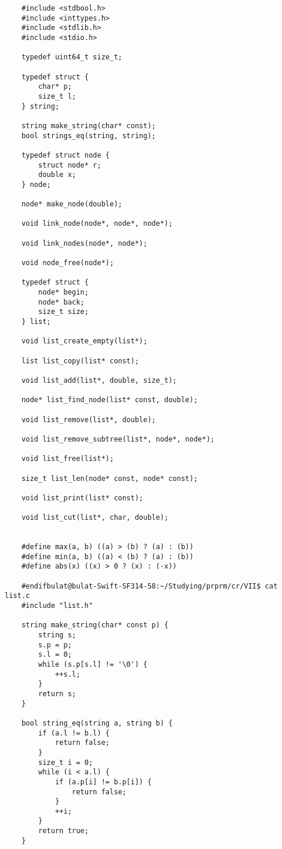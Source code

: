 \documentclass[a4paper]{article}
\newcounter{i}
\begin{document}
\begin{enumerate}[label=\textbf{\arabic*}.]
\begin{verbatim}
    #include <stdbool.h>
    #include <inttypes.h>
    #include <stdlib.h>
    #include <stdio.h>
    
    typedef uint64_t size_t;
    
    typedef struct {
        char* p;
        size_t l;
    } string;
    
    string make_string(char* const);
    bool strings_eq(string, string);
    
    typedef struct node {
        struct node* r;
        double x;
    } node;
    
    node* make_node(double);
    
    void link_node(node*, node*, node*);
    
    void link_nodes(node*, node*);
    
    void node_free(node*);
    
    typedef struct {
        node* begin;
        node* back;
        size_t size;
    } list;
    
    void list_create_empty(list*);
    
    list list_copy(list* const);
    
    void list_add(list*, double, size_t);
    
    node* list_find_node(list* const, double);
    
    void list_remove(list*, double);
    
    void list_remove_subtree(list*, node*, node*);
    
    void list_free(list*);
    
    size_t list_len(node* const, node* const);
    
    void list_print(list* const);
    
    void list_cut(list*, char, double);
    
    
    #define max(a, b) ((a) > (b) ? (a) : (b))
    #define min(a, b) ((a) < (b) ? (a) : (b))
    #define abs(x) ((x) > 0 ? (x) : (-x))
    
    #endifbulat@bulat-Swift-SF314-58:~/Studying/prprm/cr/VII$ cat list.c
    #include "list.h"
    
    string make_string(char* const p) {
        string s;
        s.p = p;
        s.l = 0;
        while (s.p[s.l] != '\0') {
            ++s.l;
        }
        return s;
    }
    
    bool string_eq(string a, string b) {
        if (a.l != b.l) {
            return false;
        }
        size_t i = 0;
        while (i < a.l) {
            if (a.p[i] != b.p[i]) {
                return false;
            }
            ++i;
        }
        return true;
    }
    

\end{verbatim}
\end{enumerate}
\end{document}
